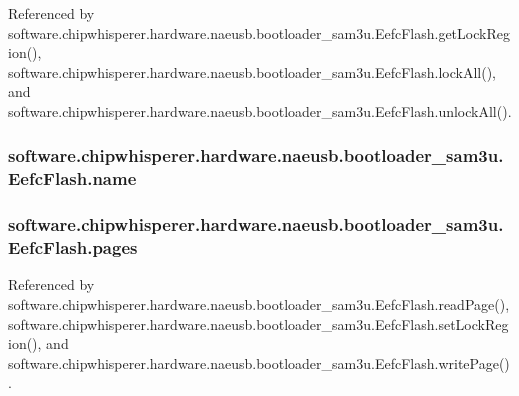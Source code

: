 Referenced by software.\+chipwhisperer.\+hardware.\+naeusb.\+bootloader\+\_\+sam3u.\+Eefc\+Flash.\+get\+Lock\+Region(), software.\+chipwhisperer.\+hardware.\+naeusb.\+bootloader\+\_\+sam3u.\+Eefc\+Flash.\+lock\+All(), and software.\+chipwhisperer.\+hardware.\+naeusb.\+bootloader\+\_\+sam3u.\+Eefc\+Flash.\+unlock\+All().

\hypertarget{classsoftware_1_1chipwhisperer_1_1hardware_1_1naeusb_1_1bootloader__sam3u_1_1EefcFlash_aacdf573a47998c7e4a4ea12d991ea966}{}
\subsubsection[{name}]{\setlength{\rightskip}{0pt plus 5cm}software.\+chipwhisperer.\+hardware.\+naeusb.\+bootloader\+\_\+sam3u.\+Eefc\+Flash.\+name}\label{classsoftware_1_1chipwhisperer_1_1hardware_1_1naeusb_1_1bootloader__sam3u_1_1EefcFlash_aacdf573a47998c7e4a4ea12d991ea966}
\hypertarget{classsoftware_1_1chipwhisperer_1_1hardware_1_1naeusb_1_1bootloader__sam3u_1_1EefcFlash_a8e3d0a12d9e4e1e65bdf8fec5a17d247}{}
\subsubsection[{pages}]{\setlength{\rightskip}{0pt plus 5cm}software.\+chipwhisperer.\+hardware.\+naeusb.\+bootloader\+\_\+sam3u.\+Eefc\+Flash.\+pages}\label{classsoftware_1_1chipwhisperer_1_1hardware_1_1naeusb_1_1bootloader__sam3u_1_1EefcFlash_a8e3d0a12d9e4e1e65bdf8fec5a17d247}


Referenced by software.\+chipwhisperer.\+hardware.\+naeusb.\+bootloader\+\_\+sam3u.\+Eefc\+Flash.\+read\+Page(), software.\+chipwhisperer.\+hardware.\+naeusb.\+bootloader\+\_\+sam3u.\+Eefc\+Flash.\+set\+Lock\+Region(), and software.\+chipwhisperer.\+hardware.\+naeusb.\+bootloader\+\_\+sam3u.\+Eefc\+Flash.\+write\+Page().

